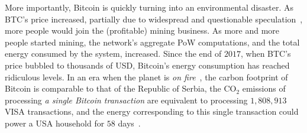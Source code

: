 More importantly, Bitcoin is quickly turning into an environmental disaster.
As BTC's price increased, partially due to widespread and questionable
speculation~\cite{griffin2020bitcoin}, more people would join the (profitable)
mining business. As more and more people started mining, the network's
aggregate PoW computations, and the total energy consumed by the system,
increased. Since the end of $2017$, when BTC's price bubbled to thousands of
USD, Bitcoin's energy consumption has reached ridiculous levels. In an era
when the planet is \emph{on fire}~\cite{klein2020fire}, the carbon footprint of
Bitcoin is comparable to that of the Republic of Serbia, the CO$_2$ emissions
of processing \emph{a single Bitcoin transaction} are equivalent to processing
$1,808,913$ VISA transactions, and the energy corresponding to this single
transaction could power a USA household for $58$ days~\cite{pow-energy}.
